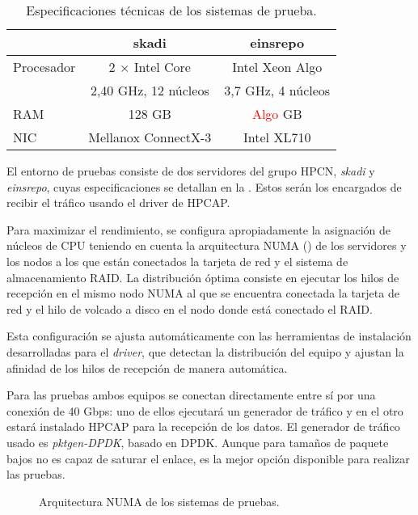 \documentclass[twoside, 12pt]{epstfg}
\begin{document}
\begin{table}[hbtp]
\centering
\small
\begin{tabular}{lcc}
\toprule & \textbf{skadi} & \textbf{einsrepo} \\ \midrule
Procesador 	& 2 $\times$ Intel Core 	& Intel Xeon Algo  	\\
			& 2,40 GHz, 12 núcleos 		& 3,7 GHz, 4 núcleos  		\\
RAM 		& 128 GB 		& \textcolor{red}{Algo} GB 			\\
NIC 		& Mellanox ConnectX-3 & Intel XL710 \\ \bottomrule
\end{tabular}
\caption{Especificaciones técnicas de los sistemas de prueba.}
\label{tab:Validacion:Sistemas}
\end{table}

El entorno de pruebas consiste de dos servidores del grupo HPCN, \textit{skadi} y \textit{einsrepo}, cuyas especificaciones se detallan en la . Estos serán los encargados de recibir el tráfico usando el driver de HPCAP.

Para maximizar el rendimiento, se configura apropiadamente la asignación de núcleos de CPU teniendo en cuenta la arquitectura \gls{NUMA} () de los servidores y los nodos a los que están conectados la tarjeta de red y el sistema de almacenamiento RAID. La distribución óptima \cite{m3omon} consiste en ejecutar los hilos de recepción en el mismo nodo NUMA al que se encuentra conectada la tarjeta de red y el hilo de volcado a disco en el nodo donde está conectado el RAID.

Esta configuración se ajusta automáticamente con las herramientas de instalación desarrolladas para el \textit{driver}, que detectan la distribución del equipo y ajustan la afinidad de los hilos de recepción de manera automática.

Para las pruebas ambos equipos se conectan directamente entre sí por una conexión de 40 Gbps: uno de ellos ejecutará un generador de tráfico y en el otro estará instalado HPCAP para la recepción de los datos. El generador de tráfico usado es \textit{pktgen-DPDK}, basado en DPDK. Aunque para tamaños de paquete bajos no es capaz de saturar el enlace, es la mejor opción disponible para realizar las pruebas.

\begin{figure}[tbp]
\centering
\footnotesize

\caption{Arquitectura NUMA de los sistemas de pruebas.}
\label{fig:Validacion:NUMAArch}
\end{figure}
\end{document}
